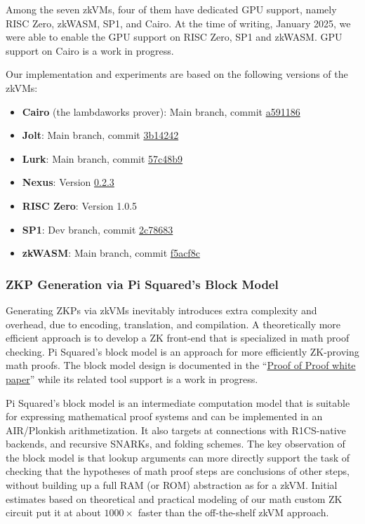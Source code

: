 \documentclass{article}
\begin{document}
Among the seven zkVMs, four of them have dedicated GPU support,
namely RISC Zero, zkWASM, SP1, and Cairo.
At the time of writing, January 2025, we were able to enable the GPU support on RISC Zero, SP1 and zkWASM.
GPU support on Cairo is a work in progress.

Our implementation and experiments are based on the following versions of the zkVMs:
\begin{itemize}
\item \textbf{Cairo} (the lambdaworks prover): Main branch, commit \href{https://github.com/lambdaclass/lambdaworks/commit/a591186e6c4dd53301b03b4ddd69369abe99f960}{a591186}
\item \textbf{Jolt}: Main branch, commit \href{https://github.com/a16z/jolt/commit/3b142426d9648299d9c6912e7e1b4698cf91491b}{3b14242}
\item \textbf{Lurk}: Main branch, commit \href{https://github.com/lurk-lab/lurk/commit/57c48b987a94ba1f9752408a0990882c9f4f506b}{57c48b9}
\item \textbf{Nexus}: Version \href{https://github.com/nexus-xyz/nexus-zkVM/releases/tag/v0.2.3}{0.2.3}
\item \textbf{RISC Zero}: Version 1.0.5
\item \textbf{SP1}: Dev branch, commit \href{https://github.com/succinctlabs/sp1/commit/2c7868364cb832531e8cafd258aa06fbab079459}{2c78683}
\item \textbf{zkWASM}: Main branch, commit \href{https://github.com/DelphinusLab/zkWasm/commit/f5acf8c58c32ac8c6426298be69958a6bea2b89a}{f5acf8c}
\end{itemize}

\subsubsection{ZKP Generation via Pi Squared's Block Model}

Generating ZKPs via zkVMs inevitably introduces extra complexity and overhead, due to encoding,
translation, and compilation.
A theoretically more efficient approach is to develop a ZK front-end that is specialized in math proof checking.
Pi Squared's block model is an approach for more efficiently ZK-proving math proofs.
The block model design is documented in
the ``\href{https://pi2.network/papers/proof-of-proof-whitepaper}{Proof of Proof white paper}'' while its related tool support
is a work in progress.


Pi Squared's block model is an intermediate computation model that is suitable for expressing
mathematical proof systems and can be implemented in an AIR/Plonkish arithmetization.
It also targets at connections with R1CS-native backends, and recursive SNARKs, and folding schemes.
The key observation of the block model
is that lookup arguments can more directly
support the task of checking that the hypotheses of math proof steps are conclusions of other steps, without building up a full RAM (or ROM) abstraction as for a zkVM.
Initial estimates based on theoretical and practical modeling of our math custom ZK circuit put it at about $1000\times$ faster than the off-the-shelf zkVM approach.
\end{document}
